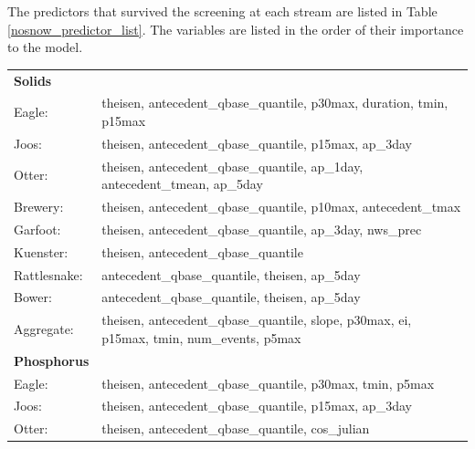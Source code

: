 \documentclass[10pt]{article}
\begin{document}
The predictors that survived the screening at each stream are listed in Table \ref{nosnow_predictor_list}. The variables are listed in the order of their importance to the model.\\

\begin{table}[h!]\small
    \begin{center}
    \begin{tabular}{ll}
        \textbf{Solids} & \\
        \hspace{5mm} Eagle: & theisen, antecedent\_qbase\_quantile, p30max, duration, tmin, p15max\\
        \hspace{5mm} Joos: & theisen, antecedent\_qbase\_quantile, p15max, ap\_3day\\
        \hspace{5mm} Otter: & theisen, antecedent\_qbase\_quantile, ap\_1day, antecedent\_tmean, ap\_5day\\
        \hspace{5mm} Brewery: & theisen, antecedent\_qbase\_quantile, p10max, antecedent\_tmax\\
        \hspace{5mm} Garfoot: & theisen, antecedent\_qbase\_quantile, ap\_3day, nws\_prec\\
        \hspace{5mm} Kuenster: & theisen, antecedent\_qbase\_quantile\\
        \hspace{5mm} Rattlesnake: & antecedent\_qbase\_quantile, theisen, ap\_5day \\
        \hspace{5mm} Bower: & antecedent\_qbase\_quantile, theisen, ap\_5day\\
        \hspace{5mm} Aggregate: & theisen, antecedent\_qbase\_quantile, slope, p30max, ei, p15max, tmin, num\_events, p5max
    \vspace{2mm}\\
        \textbf{Phosphorus} & \\
        \hspace{5mm} Eagle: & theisen, antecedent\_qbase\_quantile, p30max, tmin, p5max\\
        \hspace{5mm} Joos: & theisen, antecedent\_qbase\_quantile, p15max, ap\_3day\\
        \hspace{5mm} Otter: & theisen, antecedent\_qbase\_quantile, cos\_julian\\

\end{tabular}
\end{center}
\end{table}
\end{document}
